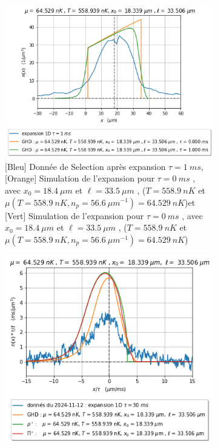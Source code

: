 \documentclass[a3, 10pt,twoside]{article}          %
\theoremstyle{plain}
\theoremstyle{definition}
\theoremstyle{remark}
\theoremstyle{definition} %
\begin{document}
		\begin{figure}[h]
			\begin{subfigure}[b]{0.45\textwidth}
        		\centering
        		\includegraphics[width=\textwidth]{Figures/simul_expansion_1_33}
        		\caption{{\color{blue}[Bleu] Donnée de Selection après expansion $\tau = 1~ms$},{\color{orange}[Orange]  Simulation de l'expansion pour $\tau= 0~ms$  , avec $x_0 = 18.4~\mu m$ et $\ell = 33.5~\mu m$ , ($T = 558.9 ~nK$ et $\mu( T = 558.9 ~nK , n_p = 56.6 ~{\mu m}^{-1} )= 64.529~nK$)}et {\color{OliveGreen}[Vert]  Simulation de l'expansion pour $\tau= 0~ms$  , avec $x_0 = 18.4~\mu m$ et $\ell = 33.5~\mu m$ , ($T = 558.9 ~nK$ et $\mu( T = 558.9 ~nK , n_p = 56.6 ~{\mu m}^{-1} )= 64.529~nK$)}   }
        		\label{fig:expansion_1_33}
    		\end{subfigure}
    		\hfill
    		\begin{subfigure}[b]{0.45\textwidth}
        		\centering
        		\includegraphics[width=\textwidth]{Figures/simul_expansion_30_33}

\end{subfigure}
\end{figure}
\end{document}

